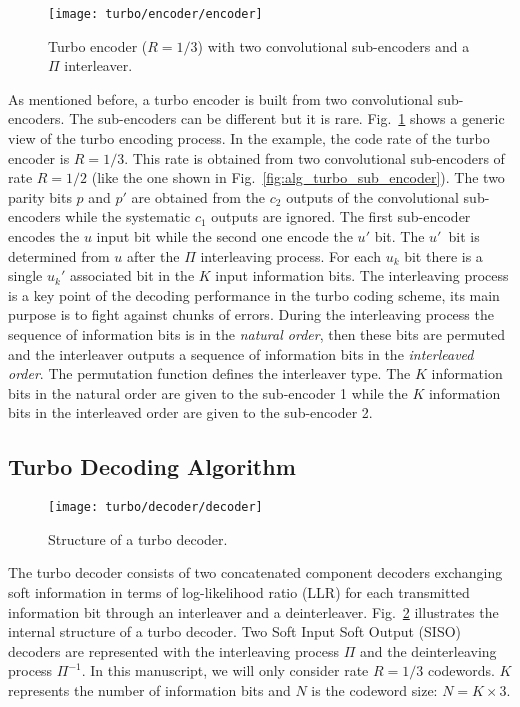 \begin{figure}[htp]
  \centering
  \texttt{[image: turbo/encoder/encoder]}
  \caption{Turbo encoder ($R = 1/3$) with two convolutional sub-encoders and a
    $\Pi$ interleaver.}
  \label{fig:alg_turbo_encoder}
\end{figure}

As mentioned before, a turbo encoder is built from two convolutional
sub-encoders. The sub-encoders can be different but it is rare.
Fig.~\ref{fig:alg_turbo_encoder} shows a generic view of the turbo encoding
process. In the example, the code rate of the turbo encoder is $R = 1/3$. This
rate is obtained from two convolutional sub-encoders of rate $R = 1/2$ (like the
one shown in Fig.~\ref{fig:alg_turbo_sub_encoder}). The two parity bits $p$ and
$p'$ are obtained from the $c_2$ outputs of the convolutional sub-encoders while
the systematic $c_1$ outputs are ignored. The first sub-encoder encodes the
$u$ input bit while the second one encode the $u'$ bit. The $u'$~bit is
determined from $u$ after the $\Pi$ interleaving process. For each $u_k$ bit
there is a single $u_k'$ associated bit in the $K$ input information bits. The
interleaving process is a key point of the decoding performance in the turbo
coding scheme, its main purpose is to fight against chunks of errors. During the
interleaving process the sequence of information bits is in the \emph{natural
order}, then these bits are permuted and the interleaver outputs a sequence of
information bits in the \emph{interleaved order}. The permutation function
defines the interleaver type. The $K$ information bits in the natural order are
given to the sub-encoder 1 while the $K$ information bits in the interleaved
order are given to the sub-encoder 2.

\subsection{Turbo Decoding Algorithm}
\label{sec:turbo_overview}

\begin{figure}[htp]
  \centering
  \texttt{[image: turbo/decoder/decoder]}
  \caption{Structure of a turbo decoder.}
  \label{fig:alg_turbo_decoder}
\end{figure}

The turbo decoder consists of two concatenated component decoders exchanging
soft information in terms of log-likelihood ratio (LLR) for each transmitted
information bit through an interleaver and a deinterleaver.
Fig.~\ref{fig:alg_turbo_decoder} illustrates the internal structure of a turbo
decoder. Two Soft Input Soft Output (SISO) decoders are represented with the
interleaving process $\Pi$ and the deinterleaving process $\Pi^{-1}$. In this
manuscript, we will only consider rate $R = 1/3$ codewords. $K$ represents the
number of information bits and $N$ is the codeword size: $N = K \times 3$.

